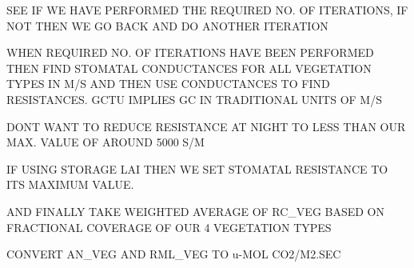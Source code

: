 S\+E\+E I\+F W\+E H\+A\+V\+E P\+E\+R\+F\+O\+R\+M\+E\+D T\+H\+E R\+E\+Q\+U\+I\+R\+E\+D N\+O. O\+F I\+T\+E\+R\+A\+T\+I\+O\+N\+S, I\+F N\+O\+T T\+H\+E\+N W\+E G\+O B\+A\+C\+K A\+N\+D D\+O A\+N\+O\+T\+H\+E\+R I\+T\+E\+R\+A\+T\+I\+O\+N

W\+H\+E\+N R\+E\+Q\+U\+I\+R\+E\+D N\+O. O\+F I\+T\+E\+R\+A\+T\+I\+O\+N\+S H\+A\+V\+E B\+E\+E\+N P\+E\+R\+F\+O\+R\+M\+E\+D T\+H\+E\+N F\+I\+N\+D S\+T\+O\+M\+A\+T\+A\+L C\+O\+N\+D\+U\+C\+T\+A\+N\+C\+E\+S F\+O\+R A\+L\+L V\+E\+G\+E\+T\+A\+T\+I\+O\+N T\+Y\+P\+E\+S I\+N M/\+S A\+N\+D T\+H\+E\+N U\+S\+E C\+O\+N\+D\+U\+C\+T\+A\+N\+C\+E\+S T\+O F\+I\+N\+D R\+E\+S\+I\+S\+T\+A\+N\+C\+E\+S. G\+C\+T\+U I\+M\+P\+L\+I\+E\+S G\+C I\+N T\+R\+A\+D\+I\+T\+I\+O\+N\+A\+L U\+N\+I\+T\+S O\+F M/\+S

D\+O\+N\textquotesingle{}T W\+A\+N\+T T\+O R\+E\+D\+U\+C\+E R\+E\+S\+I\+S\+T\+A\+N\+C\+E A\+T N\+I\+G\+H\+T T\+O L\+E\+S\+S T\+H\+A\+N O\+U\+R M\+A\+X. V\+A\+L\+U\+E O\+F A\+R\+O\+U\+N\+D 5000 S/\+M

I\+F U\+S\+I\+N\+G S\+T\+O\+R\+A\+G\+E L\+A\+I T\+H\+E\+N W\+E S\+E\+T S\+T\+O\+M\+A\+T\+A\+L R\+E\+S\+I\+S\+T\+A\+N\+C\+E T\+O I\+T\+S M\+A\+X\+I\+M\+U\+M V\+A\+L\+U\+E.

A\+N\+D F\+I\+N\+A\+L\+L\+Y T\+A\+K\+E W\+E\+I\+G\+H\+T\+E\+D A\+V\+E\+R\+A\+G\+E O\+F R\+C\+\_\+\+V\+E\+G B\+A\+S\+E\+D O\+N F\+R\+A\+C\+T\+I\+O\+N\+A\+L C\+O\+V\+E\+R\+A\+G\+E O\+F O\+U\+R 4 V\+E\+G\+E\+T\+A\+T\+I\+O\+N T\+Y\+P\+E\+S

C\+O\+N\+V\+E\+R\+T A\+N\+\_\+\+V\+E\+G A\+N\+D R\+M\+L\+\_\+\+V\+E\+G T\+O u-\/\+M\+O\+L C\+O2/\+M2.\+S\+E\+C